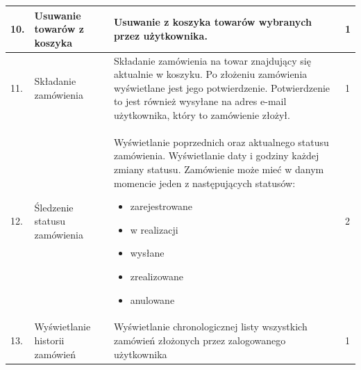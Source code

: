 \documentclass[10pt,a4paper]{article}
\begin{document}
\begin{longtable}{| m{0.5cm} | m{4cm} | p{6cm} | m{1.5cm} |}
			10.& Usuwanie towarów z koszyka			   & Usuwanie z koszyka towarów wybranych 
														 przez użytkownika. 						& 1\\ \hline
			11.& Składanie zamówienia				   & Składanie zamówienia na towar znajdujący
														 się aktualnie w koszyku. Po złożeniu 
														 zamówienia wyświetlane jest jego 
														 potwierdzenie. Potwierdzenie to jest 
														 również wysyłane na adres e-mail
														 użytkownika, który to zamówienie złożył.   & 1\\ \hline
			12.& Śledzenie statusu zamówienia		   & Wyświetlanie poprzednich oraz aktualnego
														 statusu zamówienia. Wyświetlanie 
														 daty i godziny każdej zmiany statusu. 
														 Zamówienie może mieć w danym momencie 
														 jeden z następujących statusów:
														 \begin{itemize}[label={--}]
														 \item zarejestrowane
														 \item w realizacji
														 \item wysłane
														 \item zrealizowane
														 \item anulowane
														 \end{itemize}								& 2\\ \hline
			13.& Wyświetlanie historii zamówień        & Wyświetlanie chronologicznej listy wszystkich
			 											 zamówień złożonych przez 
			 											 zalogowanego użytkownika						& 1\\ \hline
			 											 

\end{longtable}
\end{document}
